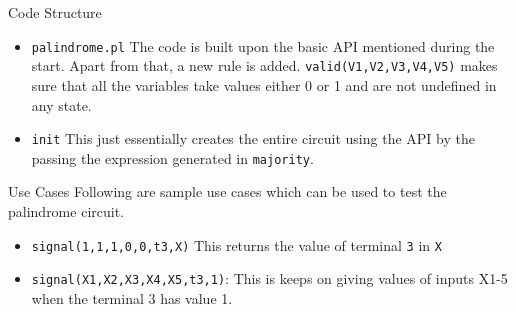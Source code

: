 \documentclass{beamer}
\begin{document}
\begin{frame}{Code Structure}
\begin{itemize}
\item\texttt{palindrome.pl}
\newline
The code is built upon the basic API mentioned during the start.
Apart from that, a new rule is added.
\newline
\texttt{valid(V1,V2,V3,V4,V5)} makes sure that all the variables take values either 0 or 1 and are not undefined in any state.
\item \texttt{init}  \newline
This just essentially creates the entire circuit using the API by the passing the expression generated in \texttt{majority}.
\end{itemize}

\end{frame}



\begin{frame}{Use Cases}
Following are sample use cases which can be used to test the palindrome circuit.
\newline
\begin{itemize}
\item \texttt{signal(1,1,1,0,0,t3,X)} This returns the value of terminal \texttt{3} in \texttt{X}
\item \texttt{signal(X1,X2,X3,X4,X5,t3,1)}: This is keeps on giving values of inputs X1-5 when the terminal 3 has value 1.
\end{itemize}
\end{frame}
\end{document}
